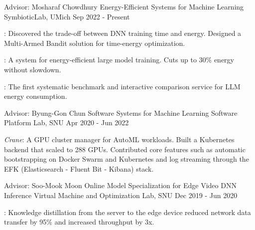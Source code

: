 

\begin{cventries}

  \cventryexp
    {Advisor: Mosharaf Chowdhury}
    {Energy-Efficient Systems for Machine Learning}
    {SymbioticLab, UMich}
    {Sep 2022 - Present}
    {
      \begin{cvitems}
        \item {\href{https://ml.energy/zeus}{}: Discovered the trade-off between DNN training time and energy. Designed a Multi-Armed Bandit solution for time-energy optimization.}
        \item {\href{https://ml.energy/zeus/perseus}{}: A system for energy-efficient large model training. Cuts up to 30\% energy without slowdown.}
        \item {\href{https://ml.energy/leaderboard}{}: The first systematic benchmark and interactive comparison service for LLM energy consumption.}
      \end{cvitems}
    }
    
  \cventryexp
    {Advisor: Byung-Gon Chun}
    {Software Systems for Machine Learning}
    {Software Platform Lab, SNU}
    {Apr 2020 - Jun 2022}
    {
      \begin{cvitems}
        \item {\textit{Crane}: A GPU cluster manager for AutoML workloads. Built a Kubernetes backend that scaled to 288 GPUs. Contributed core features such as automatic bootstrapping on Docker Swarm and Kubernetes and log streaming through the EFK (Elasticsearch - Fluent Bit - Kibana) stack.}
      \end{cvitems}
    }
    
  \cventryexp
    {Advisor: Soo-Mook Moon}
    {Online Model Specialization for Edge Video DNN Inference}
    {Virtual Machine and Optimization Lab, SNU}
    {Dec 2019 - Jun 2020}
    {
      \begin{cvitems}
      \item {\href{https://github.com/jaywonchung/shadowtutor}{}: Knowledge distillation from the server to the edge device reduced network data transfer by 95\% and increased throughput by 3x.}
      \end{cvitems}
    }
    

\end{cventries}
